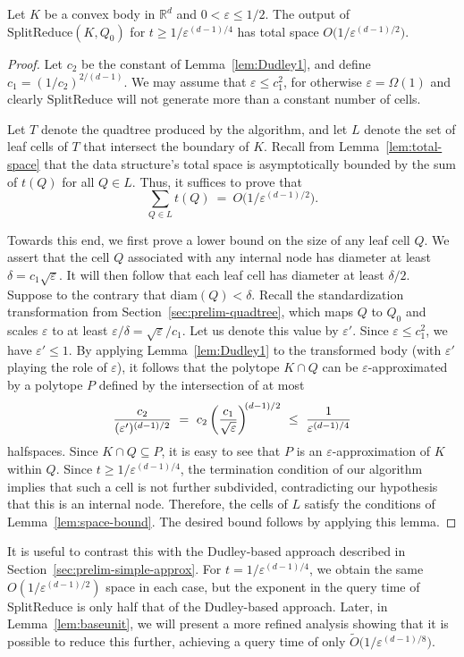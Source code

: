 \documentclass[11pt]{article}   \usepackage[letterpaper,hmargin=2.1cm,vmargin=3cm]{geometry}
\newcommand{\RE}{\mathbb{R}}    \newcommand{\ZZ}{\mathbb{Z}}    \newcommand{\eps}{\varepsilon}  \newcommand{\ST}{\,:\,}         \newcommand{\sq}{\square}
\newcommand{\SoftOh}{\widetilde{O}}
\newcommand{\inv}[1]{\frac{1}{#1}}
\newcommand{\alg}{\textrm{SplitReduce}}
\newcommand{\diam}{\mathrm{diam}}
\begin{document}
\begin{lemma} \label{lem:firstboundunit}
Let $K$ be a convex body in $\RE^d$ and $0 < \eps \le 1/2$. The output of $\alg(K,Q_0)$ for $t \geq 1/\eps^{(d-1)/4}$ has total space $O\big(1/\eps^{(d-1)/2}\big)$.
\end{lemma}


\begin{proof}
Let $c_2$ be the constant of Lemma~\ref{lem:Dudley1}, and define $c_1 = (1/c_2)^{2/(d-1)}$. We may assume that $\eps \le c_1^2$, for otherwise $\eps = \Omega(1)$ and clearly ${\alg}$ will not generate more than a constant number of cells. 

Let $T$ denote the quadtree produced by the algorithm, and let $L$ denote the set of leaf cells of $T$ that intersect the boundary of $K$. Recall from Lemma~\ref{lem:total-space} that the data structure's total space is asymptotically bounded by the sum of $t(Q)$ for all $Q \in L$. Thus, it suffices to prove that
\[
  \sum_{Q \in L} t(Q) ~ = ~ O\big(1/\eps^{(d-1)/2}\big).
\]

Towards this end, we first prove a lower bound on the size of any leaf cell $Q$. We assert that the cell $Q$ associated with any internal node has diameter at least $\delta = c_1 \sqrt{\eps}$. It will then follow that each leaf cell has diameter at least $\delta/2$. Suppose to the contrary that $\diam(Q) < \delta$. Recall the standardization transformation from Section~\ref{sec:prelim-quadtree}, which maps $Q$ to $Q_0$ and scales $\eps$ to at least $\eps/\delta = \sqrt{\eps}/c_1$. Let us denote this value by $\eps'$. Since $\eps \le c_1^2$, we have $\eps' \le 1$. By applying Lemma~\ref{lem:Dudley1} to the transformed body (with $\eps'$ playing the role of $\eps$), it follows that the polytope $K \cap Q$ can be $\eps$-approximated by a polytope $P$ defined by the intersection of at most 
\[
  \frac{c_2}{(\eps')^{(d-1)/2}} 
	~  =  ~ c_2 \left( \frac{c_1}{\sqrt{\eps}} \right)^{\kern-2pt (d-1)/2}
	~ \le ~ \inv{\eps^{(d-1)/4}}
\] 
halfspaces. Since $K \cap Q \subseteq P$, it is easy to see that $P$ is an $\eps$-approximation of $K$ within $Q$. Since $t \ge 1/\eps^{(d-1)/4}$, the termination condition of our algorithm implies that such a cell is not further subdivided, contradicting our hypothesis that this is an internal node. Therefore, the cells of $L$ satisfy the conditions of Lemma~\ref{lem:space-bound}. The desired bound follows by applying this lemma.
\end{proof}


It is useful to contrast this with the Dudley-based approach described in Section~\ref{sec:prelim-simple-approx}. For $t = 1/\eps^{(d-1)/4}$, we obtain the same $O(1/\eps^{(d-1)/2})$ space in each case, but the exponent in the query time of {\alg} is only half that of the Dudley-based approach. Later, in Lemma~\ref{lem:baseunit}, we will present a more refined analysis showing that it is possible to reduce this further, achieving a query time of only $\SoftOh\big(1/\eps^{(d-1)/8}\big)$.
\end{document}

